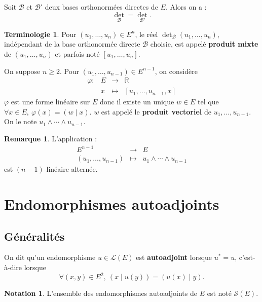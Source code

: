 \documentclass[french]{article}
\newcommand{\R}{\mathbb{R}}
\newcommand{\st}{^*}
\theoremstyle{plain}
\theoremstyle{definition}
\newtheorem*{rmq}{Remarque}
\newtheorem*{notation}{Notation}
\newtheorem*{terminologie}{Terminologie}
\theoremstyle{remark}
\begin{document}
\begin{prop}
	Soit $\mathcal{B}$ et $\mathcal{B}'$ deux bases orthonormées directes de $E$. Alors on a : $$\det_\mathcal{B}=\det_{\mathcal{B}'}.$$
\end{prop}

\begin{terminologie}
	Pour $(u_1,\ldots,u_n)\in E^n$, le réel $\det_\mathcal{B}(u_1,\ldots,u_n)$, indépendant de la base orthonormée directe $\mathcal{B}$ choisie, est appelé \textbf{produit mixte} de $(u_1,\ldots,u_n)$ et parfois noté $[u_1,\ldots,u_n]$.
\end{terminologie}

\begin{dfn}
	On suppose $n\geqslant 2$. Pour $(u_1,\ldots,u_{n-1})\in E^{n-1}$, on considère $$\begin{array}{lrcl}
		\varphi:&E&\longrightarrow&\R \\
		&x&\longmapsto&[u_1,\ldots,u_{n-1},x]
	\end{array}$$ $\varphi$ est une forme linéaire sur $E$ donc il existe un unique $w\in E$ tel que $\forall x\in E,\ \varphi(x)=(w\mid x)$. $w$ est appelé le \textbf{produit vectoriel} de $u_1,\ldots,u_{n-1}$. On le note $u_1\wedge \cdots\wedge u_{n-1}$.
\end{dfn}

\begin{rmq}
	L'application : $$\begin{array}{rcl}
		E^{n-1}&\longrightarrow& E\\
		(u_1,\ldots,u_{n-1})&\longmapsto&u_1\wedge\cdots\wedge u_{n-1}
	\end{array}$$ est $(n-1)$-linéaire alternée.
\end{rmq}

\section{Endomorphismes autoadjoints}

\subsection{Généralités}

\begin{dfn}
	On dit qu'un endomorphisme $u\in\mathcal{L}(E)$ est \textbf{autoadjoint} lorsque $u\st=u$, c'est-à-dire lorsque $$\forall (x,y)\in E^2,\ (x\mid u(y))=(u(x)\mid y).$$
\end{dfn}

\begin{notation}
	L'ensemble des endomorphismes autoadjoints de $E$ est noté $\mathcal{S}(E)$.
\end{notation}
\end{document}
